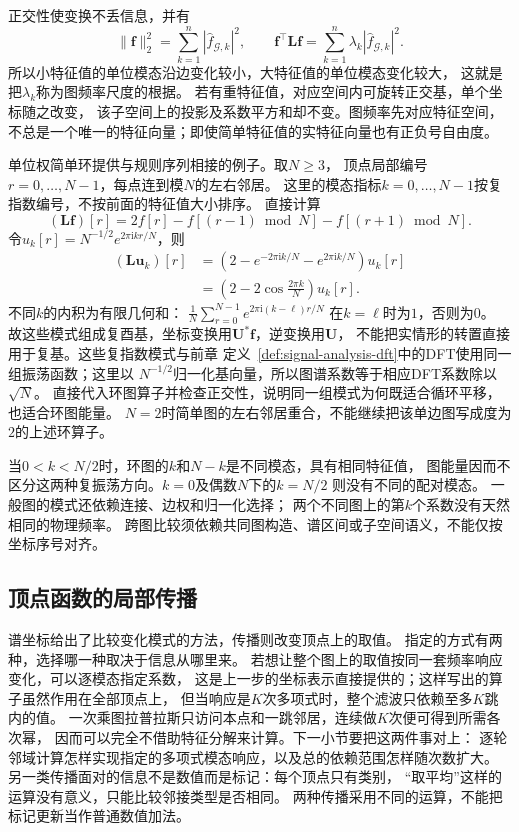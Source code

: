正交性使变换不丢信息，并有
\[
  \|\bm f\|_2^2=\sum_{k=1}^n|\widehat f_{\mathcal G,k}|^2,\qquad
  \bm f^\top\bm L\bm f
  =\sum_{k=1}^n\lambda_k|\widehat f_{\mathcal G,k}|^2.
\]
所以小特征值的单位模态沿边变化较小，大特征值的单位模态变化较大，
这就是把\(\lambda_k\)称为图频率尺度的根据。
若有重特征值，对应空间内可旋转正交基，单个坐标随之改变，
该子空间上的投影及系数平方和却不变。图频率先对应特征空间，
不总是一个唯一的特征向量；即使简单特征值的实特征向量也有正负号自由度。

单位权简单环提供与规则序列相接的例子。取\(N\geq3\)，
顶点局部编号\(r=0,\ldots,N-1\)，每点连到模\(N\)的左右邻居。
这里的模态指标\(k=0,\ldots,N-1\)按复指数编号，不按前面的特征值大小排序。
直接计算
\[
  (\bm L\bm f)[r]=2f[r]-f[(r-1)\bmod N]-f[(r+1)\bmod N].
\]
令\(u_k[r]=N^{-1/2}e^{2\pi\mathrm i kr/N}\)，则
\begin{align*}
  (\bm L\bm u_k)[r]
  &=\left(2-e^{-2\pi\mathrm i k/N}-e^{2\pi\mathrm i k/N}\right)u_k[r]\\
  &=\left(2-2\cos\frac{2\pi k}{N}\right)u_k[r].
\end{align*}
不同\(k\)的内积为有限几何和：
\(\frac1N\sum_{r=0}^{N-1}e^{2\pi\mathrm i(k-\ell)r/N}\)
在\(k=\ell\)时为\(1\)，否则为\(0\)。
故这些模式组成复酉基，坐标变换用\(\bm U^*\bm f\)，逆变换用\(\bm U\)，
不能把实情形的转置直接用于复基。这些复指数模式与前章
定义~\ref{def:signal-analysis-dft}中的DFT使用同一组振荡函数；这里以
\(N^{-1/2}\)归一化基向量，所以图谱系数等于相应DFT系数除以\(\sqrt N\)。
直接代入环图算子并检查正交性，说明同一组模式为何既适合循环平移，也适合环图能量。
\(N=2\)时简单图的左右邻居重合，不能继续把该单边图写成度为\(2\)的上述环算子。

当\(0<k<N/2\)时，环图的\(k\)和\(N-k\)是不同模态，具有相同特征值，
图能量因而不区分这两种复振荡方向。\(k=0\)及偶数\(N\)下的\(k=N/2\)
则没有不同的配对模态。
一般图的模式还依赖连接、边权和归一化选择；
两个不同图上的第\(k\)个系数没有天然相同的物理频率。
跨图比较须依赖共同图构造、谱区间或子空间语义，不能仅按坐标序号对齐。

\subsection{顶点函数的局部传播}

谱坐标给出了比较变化模式的方法，传播则改变顶点上的取值。
指定的方式有两种，选择哪一种取决于信息从哪里来。
若想让整个图上的取值按同一套频率响应变化，可以逐模态指定系数，
这是上一步的坐标表示直接提供的；这样写出的算子虽然作用在全部顶点上，
但当响应是\(K\)次多项式时，整个滤波只依赖至多\(K\)跳内的值。
一次乘图拉普拉斯只访问本点和一跳邻居，连续做\(K\)次便可得到所需各次幂，
因而可以完全不借助特征分解来计算。下一小节要把这两件事对上：
逐轮邻域计算怎样实现指定的多项式模态响应，以及总的依赖范围怎样随次数扩大。
另一类传播面对的信息不是数值而是标记：每个顶点只有类别，
“取平均”这样的运算没有意义，只能比较邻接类型是否相同。
两种传播采用不同的运算，不能把标记更新当作普通数值加法。

